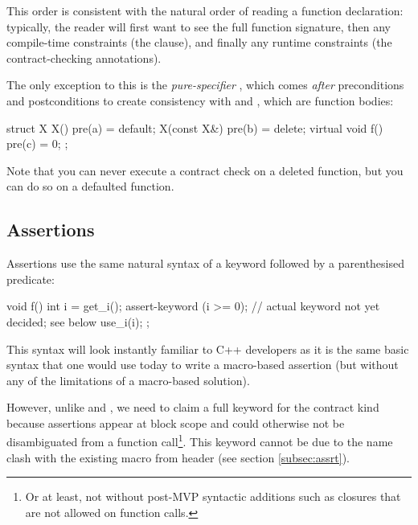This order is consistent with the natural order of reading a function declaration: typically, the reader will first want to see the full function signature, then any compile-time constraints (the  clause), and finally any runtime constraints (the contract-checking annotations).

The only exception to this is the \emph{pure-specifier} , which comes \emph{after} preconditions and postconditions to create consistency with  and , which are function bodies: 

\begin{codeblock}
struct X {
  X()              pre(a) = default;
  X(const X&)      pre(b) = delete;
  virtual void f() pre(c) = 0; 
};
\end{codeblock}

Note that you can never execute a contract check on a deleted function, but you can do so on a defaulted function.


\subsection{Assertions}
\label{subsec:assertions}

Assertions use the same natural syntax of a keyword followed by a parenthesised predicate:

\begin{codeblock}
void f() {
  int i = get_i();
  assert-keyword (i >= 0);  // actual keyword not yet decided; see below
  use_i(i);
};
\end{codeblock}

This syntax will look instantly familiar to C++ developers as it is the same basic syntax that one would use today to write a macro-based assertion (but without any of the limitations of a macro-based solution).

However, unlike  and , we need to claim a full keyword for the contract kind because assertions appear at block scope and could otherwise not be disambiguated from a function call\footnote{Or at least, not without post-MVP syntactic additions such as closures that are not allowed on function calls.}. This keyword cannot be  due to the name clash with the existing  macro from header  (see section \ref{subsec:assrt}).

